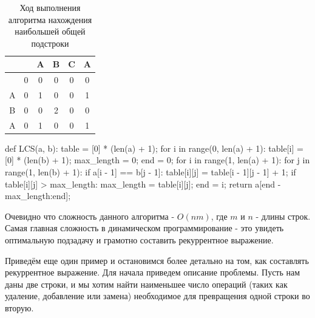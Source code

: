 \begin{table}
\centering
\begin{tabular}{|c|c|c|c|c|c|}
	\hline
	&   & \cellcolor{blue}A & \cellcolor{blue}B & \cellcolor{blue}C & \cellcolor{blue}A \\\hline
	& \cellcolor{lightblue}0 & \cellcolor{lightblue}0 & \cellcolor{lightblue}0 & \cellcolor{lightblue}0 & \cellcolor{lightblue}0 \\\hline
	\cellcolor{blue}A & \cellcolor{lightblue}0 & \cellcolor{red}1 & \cellcolor{lightblue}0 & \cellcolor{lightblue}0 & \cellcolor{red}1 \\\hline
	\cellcolor{blue}B & \cellcolor{lightblue}0 & \cellcolor{lightblue}0 & \cellcolor{red}2 & \cellcolor{lightblue}0 & \cellcolor{lightblue}0 \\\hline
	\cellcolor{blue}A & \cellcolor{lightblue}0 & \cellcolor{red}1 & \cellcolor{lightblue}0 & \cellcolor{lightblue}0 & \cellcolor{red}1 \\\hline
\end{tabular}
\caption{Ход выполнения алгоритма нахождения наибольшей общей подстроки}
\end{table}

\begin{python}
def LCS(a, b):
	table = [0] * (len(a) + 1);
	for i in range(0, len(a) + 1):
		table[i] = [0] * (len(b) + 1);
	max_length = 0;
	end = 0;
	for i in range(1, len(a) + 1):
		for j in range(1, len(b) + 1):
			if a[i - 1] == b[j - 1]:
				table[i][j] = table[i - 1][j - 1] + 1;
				if table[i][j] > max_length:
					max_length = table[i][j];
					end = i;
	return a[end - max_length:end];
\end{python}

Очевидно что сложность данного алгоритма - $O(nm)$, где $m$ и $n$ - длины строк. 
Самая главная сложность в динамическом программирование - это увидеть оптимальную подзадачу
и грамотно составить рекуррентное выражение. 

Приведём еще один пример и остановимся более детально на том,
как составлять рекуррентное выражение. Для начала приведем описание 
проблемы. Пусть нам даны две строки, и мы хотим найти наименьшее 
число операций (таких как удаление, добавление или замена) необходимое для
превращения одной строки во вторую. 


